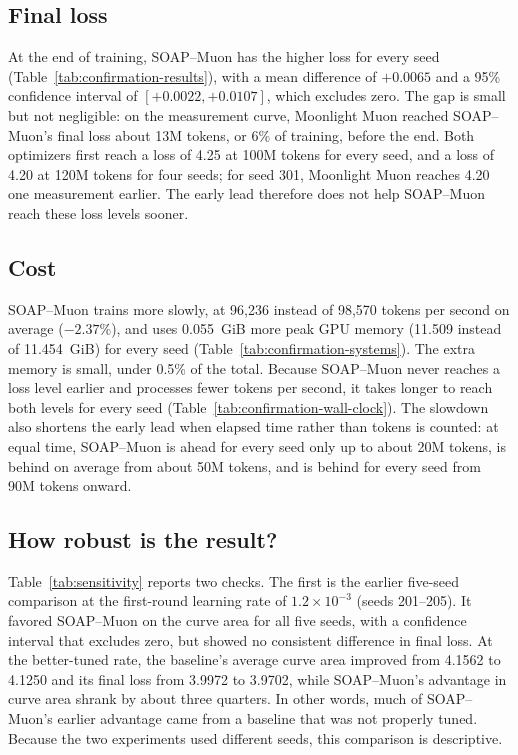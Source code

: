 \subsection{Final loss}

At the end of training, SOAP--Muon has the higher loss for every seed
(Table~\ref{tab:confirmation-results}), with a mean difference of $+0.0065$ and
a 95\% confidence interval of $[+0.0022,+0.0107]$, which excludes zero. The gap
is small but not negligible: on the measurement curve, Moonlight Muon reached
SOAP--Muon's final loss about 13M tokens, or 6\% of training, before the end.
Both optimizers first reach a loss of 4.25 at 100M tokens for every seed, and a
loss of 4.20 at 120M tokens for four seeds; for seed 301, Moonlight Muon
reaches 4.20 one measurement earlier. The early lead therefore does not help
SOAP--Muon reach these loss levels sooner.

\subsection{Cost}

SOAP--Muon trains more slowly, at 96,236 instead of 98,570 tokens per second on
average ($-2.37\%$), and uses 0.055~GiB more peak GPU memory (11.509 instead of
11.454~GiB) for every seed (Table~\ref{tab:confirmation-systems}). The extra
memory is small, under 0.5\% of the total. Because SOAP--Muon never reaches a
loss level earlier and processes fewer tokens per second, it takes longer to
reach both levels for every seed (Table~\ref{tab:confirmation-wall-clock}). The
slowdown also shortens the early lead when elapsed time rather than tokens is
counted: at equal time, SOAP--Muon is ahead for every seed only up to about 20M
tokens, is behind on average from about 50M tokens, and is behind for every
seed from 90M tokens onward.

\subsection{How robust is the result?}
\label{sec:sensitivity}

Table~\ref{tab:sensitivity} reports two checks. The first is the earlier
five-seed comparison at the first-round learning rate of $1.2\times10^{-3}$
(seeds 201--205). It favored SOAP--Muon on the curve area for all five seeds,
with a confidence interval that excludes zero, but showed no consistent
difference in final loss. At the better-tuned rate, the baseline's average
curve area improved from 4.1562 to 4.1250 and its final loss from 3.9972 to
3.9702, while SOAP--Muon's advantage in curve area shrank by about three
quarters. In other words, much of SOAP--Muon's
earlier advantage came from a baseline that was not properly tuned. Because the
two experiments used different seeds, this comparison is descriptive.

